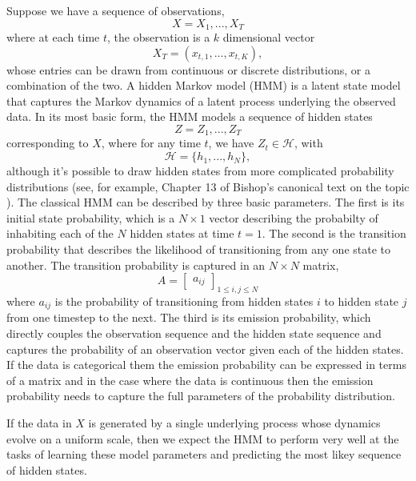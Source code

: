 \documentclass{article}
\begin{document}
Suppose we have a sequence of observations, 
\[
X = X_1,...,X_T
\]
where at each time $t$, the observation is a $k$ dimensional vector
\[
X_T = (x_{t,1},...,x_{t,K}),
\] 
whose entries can be drawn from continuous or discrete distributions, or a combination of the two.  
A hidden Markov model (HMM) is a latent state model that captures the Markov dynamics of a latent process underlying the observed data.  In its most basic form, the HMM models a sequence of hidden states
\[
Z = Z_1,...,Z_T
\]
corresponding to $X$, where for any time $t$, we have $Z_t\in \mathcal H$, with 
\[
\mathcal{H} = \{h_1,...,h_N\},
\]
although it's possible to draw hidden states from more complicated probability distributions (see, for example, Chapter 13 of Bishop's canonical text on the topic \cite{B06}).  The classical HMM can be described by three basic parameters.  The first is its initial state probability, which is a $N\times 1$ vector describing the probabilty of inhabiting each of the $N$ hidden states at time $t=1$.  The second is the transition probability that describes the likelihood of transitioning from any one state to another.  The transition probability is captured in an $N\times N$ matrix, 
\[
A = \begin{bmatrix}
a_{ij}
\end{bmatrix}_{1\leq i,j\leq N}
\]
where $a_{ij}$ is the probability of transitioning from hidden states $i$ to hidden state $j$ from one timestep to the next.  The third is its emission probability, which directly couples the observation sequence and the hidden state sequence and captures the probability of an observation vector given each of the hidden states. If the data is categorical them the emission probability can be expressed in terms of a matrix and in the case where the data is continuous then the emission probability needs to capture the full parameters of the probability distribution.

If the data in $X$ is generated by a single underlying process whose dynamics evolve on a uniform scale, then we expect the HMM to perform very well at the tasks of learning these model parameters and predicting the most likey sequence of hidden states. 
\end{document}

